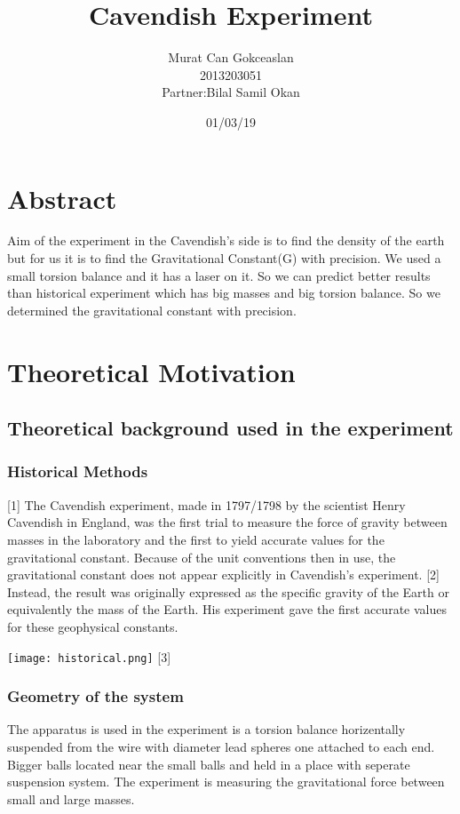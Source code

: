 \documentclass[12pt]{article}
\title{Cavendish Experiment}
\author{Murat Can Gokceaslan \\ 2013203051\\Partner:Bilal Samil Okan}
\date{01/03/19}
\begin{document}
\maketitle

\section{Abstract}
Aim of the experiment in the Cavendish's side is to find the density of the earth but for us it is to find the Gravitational Constant(G) with precision. We used a small torsion balance and it has a laser on it. So we can predict better results than historical experiment which has big masses and big torsion balance. So we determined the gravitational constant with precision.
\section{Theoretical Motivation}
\subsection{Theoretical background used in the experiment}
\subsubsection{Historical Methods}
[1] The Cavendish experiment, made in 1797/1798 by the scientist Henry Cavendish in England, was the first trial to measure the force of gravity between masses in the laboratory and the first to yield accurate values for the gravitational constant. Because of the unit conventions then in use, the gravitational constant does not appear explicitly in Cavendish's experiment. [2] Instead, the result was originally expressed as the specific gravity of the Earth or equivalently the mass of the Earth. His experiment gave the first accurate values for these geophysical constants.
\begin{center}
\texttt{[image: historical.png]}
[3]
\end{center}
\subsubsection{Geometry of the system}
The apparatus is used in the experiment is a torsion balance horizentally suspended from the wire with diameter lead spheres one attached to each end. Bigger balls located near the small balls and held in a place with seperate suspension system. The experiment is measuring the gravitational force between small and large masses.
\end{document}
